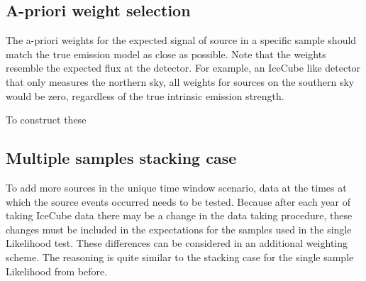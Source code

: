 \subsection{A-priori weight selection}
The a-priori weights for the expected signal of source in a specific sample should match the true emission model as close as possible.
Note that the weights resemble the expected flux at the detector.
For example, an IceCube like detector that only measures the northern sky, all weights for sources on the southern sky would be zero, regardless of the true intrinsic emission strength.

To construct these


\subsection{Multiple samples stacking case}
To add more sources in the unique time window scenario, data at the times at which the source events occurred needs to be tested.
Because after each year of taking IceCube data there may be a change in the data taking procedure, these changes must be included in the expectations for the samples used in the single Likelihood test.
These differences can be considered in an additional weighting scheme.
The reasoning is quite similar to the stacking case for the single sample Likelihood from before.

